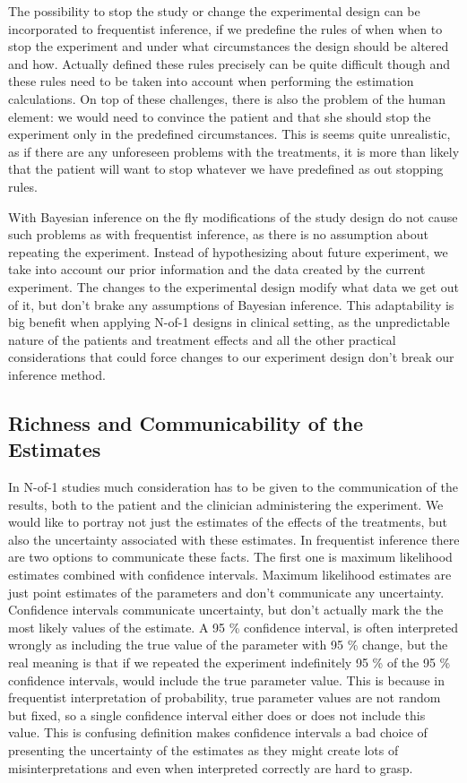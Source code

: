 \documentclass[12pt,a4paper,leqno]{report}
\theoremstyle{plain}
\theoremstyle{definition}
\theoremstyle{remark}
\begin{document}
The possibility to stop the study or change the experimental design can be incorporated
to frequentist inference, if we predefine the rules of when when to stop the experiment
and under what circumstances the design should be altered and how. Actually defined these
rules precisely can be quite difficult though and these rules need to be taken into
account when performing the estimation calculations. On top of these challenges, there is
also the problem of the human element: we would need to convince the patient and that she
should stop the experiment only in the predefined circumstances. This is seems quite
unrealistic, as if there are any unforeseen problems with the treatments, it is more than
likely that the patient will want to stop whatever we have predefined as out stopping
rules.

With Bayesian inference on the fly modifications of the study design do not cause such
problems as with frequentist inference, as there is no assumption about repeating the
experiment. Instead of hypothesizing about future experiment, we take into account our
prior information and the data created by the current experiment. The changes to the
experimental design modify what data we get out of it, but don't brake any assumptions of
Bayesian inference. This adaptability is big benefit when applying N-of-1 designs in
clinical setting, as the unpredictable nature of the patients and treatment effects and
all the other practical considerations that could force changes to our experiment design
don't break our inference method.

\subsection{Richness and Communicability of the Estimates}\label{whybayes}

In N-of-1 studies much consideration has to be given to the communication of the results,
both to the patient and the clinician administering the experiment. We would like to
portray not just the estimates of the effects of the treatments, but also the uncertainty
associated with these estimates. In frequentist inference there are two options to
communicate these facts. The first one is maximum likelihood estimates combined with
confidence intervals. Maximum likelihood estimates are just point estimates of the
parameters and don't communicate any uncertainty. Confidence intervals communicate
uncertainty, but don't actually mark the the most likely values of the estimate. A 95 \%
confidence interval, is often interpreted wrongly as including the true value of the
parameter with 95 \% change, but the real meaning is that if we repeated the experiment
indefinitely 95 \% of the 95 \% confidence intervals, would include the true parameter
value. This is because in frequentist interpretation of probability, true parameter
values are not random but fixed, so a single confidence interval either does or does not
include this value. This is confusing definition makes confidence intervals a bad choice
of presenting the uncertainty of the estimates as they might create lots of
misinterpretations and even when interpreted correctly are hard to grasp.
\end{document}
